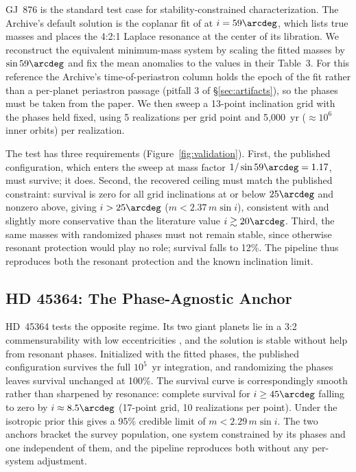 \documentclass[twocolumn]{aastex631}
\newcommand{\msini}{m\sin i}
\begin{document}
GJ~876 is the standard test case for stability-constrained
characterization. The Archive's default solution is the coplanar fit of
\citet{Rivera2010} at $i = 59\arcdeg$, which lists true masses and places
the 4:2:1 Laplace resonance at the center of its libration. We reconstruct
the equivalent minimum-mass system by scaling the fitted masses by
$\sin 59\arcdeg$ and fix the mean anomalies to the values in their
Table~3. For this reference the Archive's time-of-periastron column holds
the epoch of the fit rather than a per-planet periastron passage (pitfall
3 of \S\ref{sec:artifacts}), so the phases must be taken from the paper.
We then sweep a 13-point inclination grid with the phases held fixed,
using 5 realizations per grid point and 5{,}000~yr ($\approx 10^6$ inner
orbits) per realization.

The test has three requirements (Figure~\ref{fig:validation}). First, the
published configuration, which enters the sweep at mass factor
$1/\sin 59\arcdeg = 1.17$, must survive; it does. Second, the recovered
ceiling must match the published constraint: survival is zero for all grid
inclinations at or below $25\arcdeg$ and nonzero above, giving
$i > 25\arcdeg$ ($m < 2.37\,\msini$), consistent with and slightly more
conservative than the literature value $i \gtrsim 20\arcdeg$. Third, the
same masses with randomized phases must not remain stable, since otherwise
resonant protection would play no role; survival falls to 12\%. The
pipeline thus reproduces both the resonant protection and the known
inclination limit.

\subsection{HD 45364: The Phase-Agnostic Anchor} \label{sec:hd45364}

HD~45364 tests the opposite regime. Its two giant planets lie in a 3:2
commensurability with low eccentricities \citep{Correia2009}, and the
\citet{Li2022} solution is stable without help from resonant phases.
Initialized with the fitted phases, the published configuration survives
the full $10^5$~yr integration, and randomizing the phases leaves survival
unchanged at 100\%. The survival curve is correspondingly smooth rather
than sharpened by resonance: complete survival for $i \ge 45\arcdeg$
falling to zero by $i \approx 8.5\arcdeg$ (17-point grid, 10 realizations
per point). Under the isotropic prior this gives a 95\% credible limit of
$m < 2.29\,\msini$. The two anchors bracket the survey population, one
system constrained by its phases and one independent of them, and the
pipeline reproduces both without any per-system adjustment.
\end{document}
